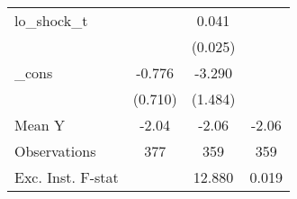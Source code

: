 {\begin{tabular}{l*{3}{c}}
\addlinespace
lo\_shock\_t  &                     &       0.041         &                     \\
            &                     &     (0.025)         &                     \\
\addlinespace
\_cons      &      -0.776         &      -3.290\sym{**} &                     \\
            &     (0.710)         &     (1.484)         &                     \\
\midrule
Mean Y      &       -2.04         &       -2.06         &       -2.06         \\
Observations&         377         &         359         &         359         \\
Exc. Inst. F-stat&                     &      12.880         &       0.019         \\
\bottomrule
\end{tabular}
}
